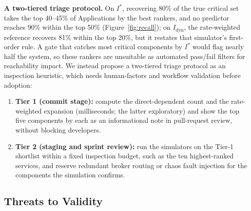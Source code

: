 \noindent\textbf{A two-tiered triage protocol.} On $I^*$, recovering 80\% of the true critical set takes the top 40--45\% of Applications by the best rankers, and no predictor reaches 90\% within the top 50\% (Figure~\ref{fig:recall}); on $I_{\text{dyn}}$, the rate-weighted reference recovers 81\% within the top 20\%, but it restates that simulator's first-order rule. A gate that catches most critical components by $I^*$ would flag nearly half the system, so these rankers are unsuitable as automated pass/fail filters for reachability impact. We instead propose a two-tiered triage protocol as an inspection heuristic, which needs human-factors and workflow validation before adoption:
\begin{enumerate}\tightlist
    \item \textbf{Tier 1 (commit stage):} compute the direct-dependent count and the rate-weighted expansion (milliseconds; the latter exploratory) and show the top five components by each as an informational note in pull-request review, without blocking developers.
    \item \textbf{Tier 2 (staging and sprint review):} run the simulators on the Tier-1 shortlist within a fixed inspection budget, such as the ten highest-ranked services, and reserve redundant broker routing or chaos fault injection for the components the simulation confirms.
\end{enumerate}

\subsection{Threats to Validity}
\label{sec:8.3}
\label{sec:threats}

